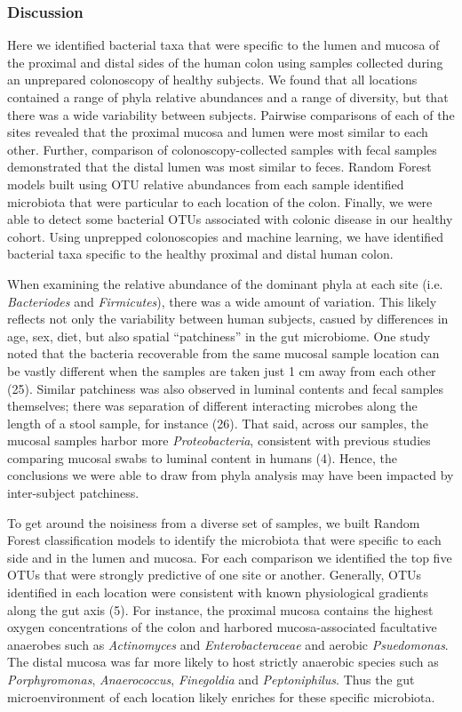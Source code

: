 \documentclass[12pt,]{article}
\begin{document}
\subsubsection{Discussion}\label{discussion}

Here we identified bacterial taxa that were specific to the lumen and
mucosa of the proximal and distal sides of the human colon using samples
collected during an unprepared colonoscopy of healthy subjects. We found
that all locations contained a range of phyla relative abundances and a
range of diversity, but that there was a wide variability between
subjects. Pairwise comparisons of each of the sites revealed that the
proximal mucosa and lumen were most similar to each other. Further,
comparison of colonoscopy-collected samples with fecal samples
demonstrated that the distal lumen was most similar to feces. Random
Forest models built using OTU relative abundances from each sample
identified microbiota that were particular to each location of the
colon. Finally, we were able to detect some bacterial OTUs associated
with colonic disease in our healthy cohort. Using unprepped
colonoscopies and machine learning, we have identified bacterial taxa
specific to the healthy proximal and distal human colon.

When examining the relative abundance of the dominant phyla at each site
(i.e. \emph{Bacteriodes} and \emph{Firmicutes}), there was a wide amount
of variation. This likely reflects not only the variability between
human subjects, casued by differences in age, sex, diet, but also
spatial ``patchiness'' in the gut microbiome. One study noted that the
bacteria recoverable from the same mucosal sample location can be vastly
different when the samples are taken just 1 cm away from each other
(25). Similar patchiness was also observed in luminal contents and fecal
samples themselves; there was separation of different interacting
microbes along the length of a stool sample, for instance (26). That
said, across our samples, the mucosal samples harbor more
\emph{Proteobacteria}, consistent with previous studies comparing
mucosal swabs to luminal content in humans (4). Hence, the conclusions
we were able to draw from phyla analysis may have been impacted by
inter-subject patchiness.

To get around the noisiness from a diverse set of samples, we built
Random Forest classification models to identify the microbiota that were
specific to each side and in the lumen and mucosa. For each comparison
we identified the top five OTUs that were strongly predictive of one
site or another. Generally, OTUs identified in each location were
consistent with known physiological gradients along the gut axis (5).
For instance, the proximal mucosa contains the highest oxygen
concentrations of the colon and harbored mucosa-associated facultative
anaerobes such as \emph{Actinomyces} and \emph{Enterobacteraceae} and
aerobic \emph{Psuedomonas}. The distal mucosa was far more likely to
host strictly anaerobic species such as \emph{Porphyromonas},
\emph{Anaerococcus}, \emph{Finegoldia} and \emph{Peptoniphilus}. Thus
the gut microenvironment of each location likely enriches for these
specific microbiota.
\end{document}
